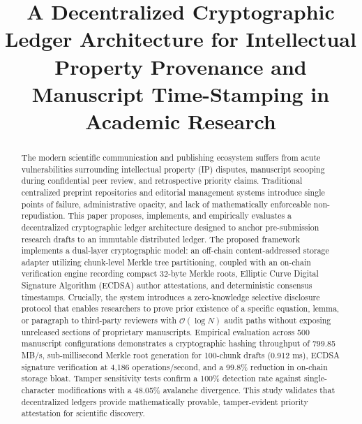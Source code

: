 \documentclass[conference]{IEEEtran}
\begin{document}
\title{A Decentralized Cryptographic Ledger Architecture for Intellectual Property Provenance and Manuscript Time-Stamping in Academic Research}

\author{
}

\maketitle

\begin{abstract}
The modern scientific communication and publishing ecosystem suffers from acute vulnerabilities surrounding intellectual property (IP) disputes, manuscript scooping during confidential peer review, and retrospective priority claims. Traditional centralized preprint repositories and editorial management systems introduce single points of failure, administrative opacity, and lack of mathematically enforceable non-repudiation. This paper proposes, implements, and empirically evaluates a decentralized cryptographic ledger architecture designed to anchor pre-submission research drafts to an immutable distributed ledger. The proposed framework implements a dual-layer cryptographic model: an off-chain content-addressed storage adapter utilizing chunk-level Merkle tree partitioning, coupled with an on-chain verification engine recording compact 32-byte Merkle roots, Elliptic Curve Digital Signature Algorithm (ECDSA) author attestations, and deterministic consensus timestamps. Crucially, the system introduces a zero-knowledge selective disclosure protocol that enables researchers to prove prior existence of a specific equation, lemma, or paragraph to third-party reviewers with $\mathcal{O}(\log N)$ audit paths without exposing unreleased sections of proprietary manuscripts. Empirical evaluation across 500 manuscript configurations demonstrates a cryptographic hashing throughput of 799.85 MB/s, sub-millisecond Merkle root generation for 100-chunk drafts (0.912 ms), ECDSA signature verification at 4,186 operations/second, and a 99.8\% reduction in on-chain storage bloat. Tamper sensitivity tests confirm a 100\% detection rate against single-character modifications with a 48.05\% avalanche divergence. This study validates that decentralized ledgers provide mathematically provable, tamper-evident priority attestation for scientific discovery.
\end{abstract}
\end{document}
